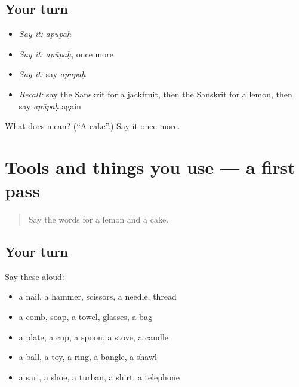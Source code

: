 \subsection*{Your turn}
\begin{itemize}
\raggedright
  \item \emph{Say it:} \emph{apūpaḥ}
  \item \emph{Say it:} \emph{apūpaḥ}, once more
  \item \emph{Say it:} say \emph{apūpaḥ}
  \item \emph{Recall:} say the Sanskrit for a jackfruit, then the Sanskrit for a lemon, then say \emph{apūpaḥ} again
\end{itemize}

\begin{tcolorbox}[breakable,colback=teal!4,colframe=teal!35!black,title={Before you move on}]
What does  mean? (\textquotedblleft{}A cake\textquotedblright{}.) Say it once more.
\end{tcolorbox}
\section[(dialogue)]{Tools and things you use — a first pass}

\label{lesson:SA-R109-first-pass-tools-and-things-you-use}



\begin{quote}
Say the words for a lemon and a cake.
\end{quote}

\subsection*{Your turn}
Say these aloud:

\begin{itemize}
\raggedright
  \item a nail, a hammer, scissors, a needle, thread
  \item a comb, soap, a towel, glasses, a bag
  \item a plate, a cup, a spoon, a stove, a candle
  \item a ball, a toy, a ring, a bangle, a shawl
  \item a sari, a shoe, a turban, a shirt, a telephone
\end{itemize}

